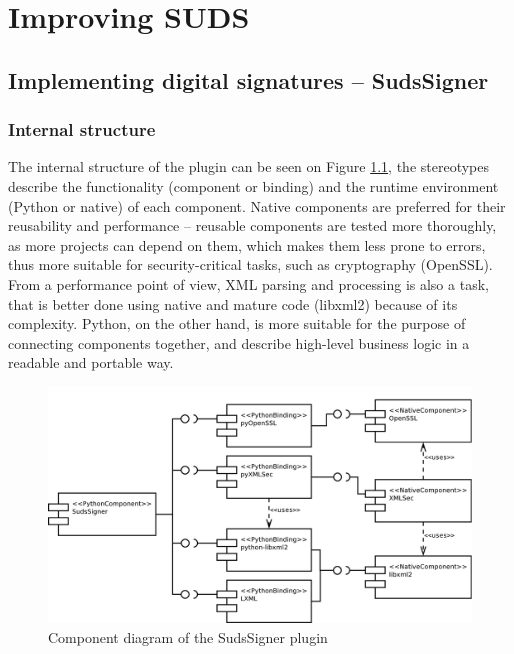 \chapter{Improving SUDS}

\section{Implementing digital signatures -- SudsSigner}

\subsection{Internal structure}

The internal structure of the plugin can be seen on Figure \ref{fig:cmpdSudsSigner}, the stereotypes describe the functionality (component or binding) and the runtime environment (Python or native) of each component. Native components are preferred for their reusability and performance -- reusable components are tested more thoroughly, as more projects can depend on them, which makes them less prone to errors, thus more suitable for security-critical tasks, such as cryptography (OpenSSL). From a performance point of view, XML parsing and processing is also a task, that is better done using native and mature code (libxml2) because of its complexity. Python, on the other hand, is more suitable for the purpose of connecting components together, and describe high-level business logic in a readable and portable way.

\begin{figure}[htbp]
 \centering
 \includegraphics[width=\textwidth]{images/cmpdSudsSigner.pdf}
 \caption{Component diagram of the SudsSigner plugin}
 \label{fig:cmpdSudsSigner}
\end{figure}

